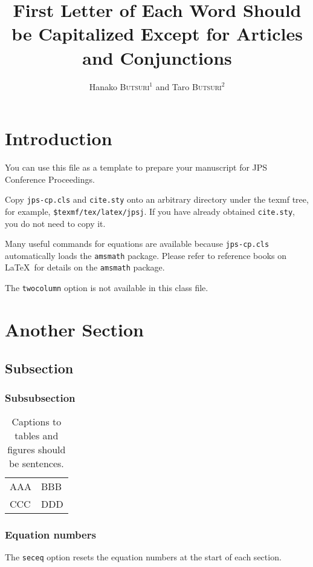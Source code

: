 \documentclass{jps-cp}
\title{First Letter of Each Word Should be Capitalized Except for Articles and Conjunctions}
\author{Hanako \textsc{Butsuri}$^{1}$ and Taro \textsc{Butsuri}$^{2}$}
\begin{document}
\maketitle

\section{Introduction}

You can use this file as a template to prepare your manuscript for JPS Conference Proceedings\cite{cp,jpsj,ptep,instructions,format}.

Copy \verb|jps-cp.cls| and \verb|cite.sty| onto an arbitrary directory under the texmf tree, for example, \verb|$texmf/tex/latex/jpsj|. If you have already obtained \verb|cite.sty|, you do not need to copy it.

Many useful commands for equations are available because \verb|jps-cp.cls| automatically loads the \verb|amsmath| package. Please refer to reference books on \LaTeX\ for details on the \verb|amsmath| package.

The \verb|twocolumn| option is not available in this class file.

\section{Another Section}
\subsection{Subsection}
\subsubsection{Subsubsection}


\begin{table}[tbh]
\caption{Captions to tables and figures should be sentences.}
\label{t1}
\begin{tabular}{ll}
\hline
AAA & BBB \\
CCC & DDD \\
\hline
\end{tabular}
\end{table}

\subsubsection{Equation numbers}

The \verb|seceq| option resets the equation numbers at the start of each section.
\end{document}
